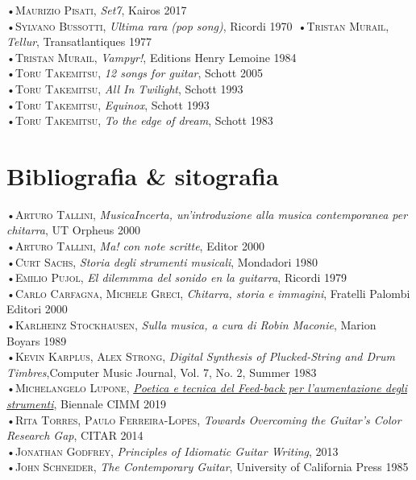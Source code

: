 \documentclass[oneside]{article}
\begin{document}
\begin{multicols*}{2}
•\textsc{\textsf {Maurizio Pisati}}, \emph{Set7}, Kairos 2017\\
•\textsc{\textsf {Sylvano Bussotti}}, \emph{Ultima rara (pop song)}, Ricordi 1970\
•\textsc{\textsf {Tristan Murail}}, \emph{Tellur}, Transatlantiques 1977\\
•\textsc{\textsf {Tristan Murail}}, \emph{Vampyr!}, Editions Henry Lemoine 1984\\
•\textsc{\textsf {Toru Takemitsu}}, \emph{12 songs for guitar}, Schott 2005\\
•\textsc{\textsf {Toru Takemitsu}}, \emph{All In Twilight}, Schott 1993\\
•\textsc{\textsf {Toru Takemitsu}}, \emph{Equinox}, Schott 1993\\
•\textsc{\textsf {Toru Takemitsu}}, \emph{To the edge of dream}, Schott 1983\\




\section{ Bibliografia \& sitografia}
•\textsc{\textsf {Arturo Tallini}}, \emph{MusicaIncerta, un'introduzione alla musica contemporanea per chitarra}, UT Orpheus 2000\\
•\textsc{\textsf {Arturo Tallini}}, \emph{Ma! con note scritte}, Editor 2000\\
•\textsc{\textsf {Curt Sachs}}, \emph{Storia degli strumenti musicali}, Mondadori 1980\\
•\textsc{\textsf {Emilio Pujol}}, \emph{El dilemmma del sonido en la guitarra}, Ricordi 1979\\
•\textsc{\textsf {Carlo Carfagna, Michele Greci}}, \emph{Chitarra, storia e immagini}, Fratelli Palombi Editori 2000\\
•\textsc{\textsf {Karlheinz Stockhausen}}, \emph{Sulla musica, a cura di Robin Maconie}, Marion Boyars 1989\\
•\textsc{\textsf {Kevin Karplus, Alex Strong}}, \emph{Digital Synthesis of Plucked-String and Drum Timbres},Computer Music Journal, Vol. 7, No. 2,
Summer 1983\\
•\textsc{\textsf {Michelangelo Lupone}}, \emph{\href{https://www.youtube.com/watch?v=btioUhxSoCM}{Poetica e tecnica del Feed-back per l’aumentazione degli strumenti}}, Biennale CIMM 2019\\
•\textsc{\textsf {Rita Torres, Paulo Ferreira-Lopes}}, \emph{Towards Overcoming the Guitar's Color Research Gap}, CITAR 2014\\
•\textsc{\textsf {Jonathan Godfrey}}, \emph{Principles of Idiomatic Guitar Writing},  2013\\
•\textsc{\textsf {John Schneider}}, \emph{The Contemporary Guitar},  University of California Press 1985\\


\end{multicols*}
\end{document}
